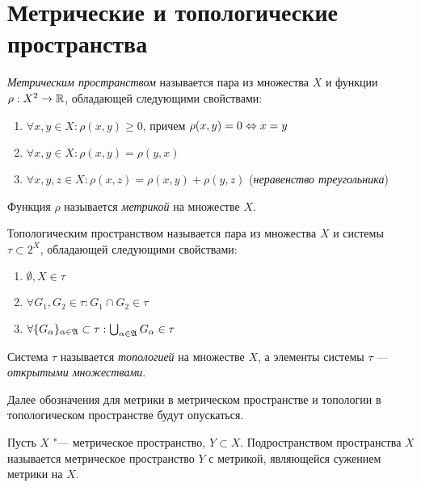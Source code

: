 \section{Метрические и топологические пространства}

\begin{definition}
	\textit{Метрическим пространством} называется пара из множества $X$ и функции $\rho : X^2 \to \mathbb{R}$, обладающей следующими свойствами:
	\begin{enumerate}
		\item $\forall x, y \in X: \rho(x, y) \ge 0$, причем $\rho(x, y) = 0 \Leftrightarrow x = y$
		\item $\forall x, y \in X: \rho(x, y) = \rho(y, x)$
		\item $\forall x, y, z \in X: \rho(x, z) = \rho(x, y) + \rho(y, z)$ (\textit{неравенство треугольника})
	\end{enumerate}

	Функция $\rho$ называется \textit{метрикой} на множестве $X$.
\end{definition}

\begin{definition}
	Топологическим пространством называется пара из множества $X$ и системы $\tau \subset 2^X$, обладающей следующими свойствами:
	\begin{enumerate}
		\item $\emptyset, X \in \tau$
		\item $\forall G_1, G_2 \in \tau: G_1 \cap G_2 \in \tau$
		\item $\forall \{G_\alpha\}_{\alpha \in \mathfrak A} \subset \tau: \bigcup_{\alpha \in \mathfrak A}G_\alpha\in \tau$
	\end{enumerate}
	
	Система $\tau$ называется \textit{топологией} на множестве $X$, а элементы системы $\tau$ --- \textit{открытыми множествами}.
\end{definition}

\begin{note}
	Далее обозначения для метрики в метрическом пространстве и топологии в топологическом пространстве будут опускаться.
\end{note}

\begin{definition}
	Пусть $X$ "--- метрическое пространство, $Y \subset X$. Подространством пространства $X$ называется метрическое пространство $Y$ с метрикой, являющейся сужением метрики на $X$.
\end{definition}

